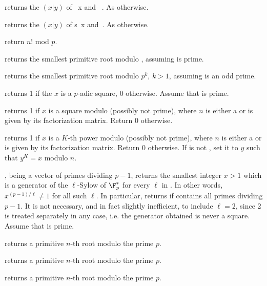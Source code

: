  returns the  $(x|y)$
of ~x and ~. As  otherwise.

 returns the  $(x|y)$
of s~x and~. As  otherwise.

 return $n!$ mod $p$.

 returns the smallest primitive root modulo
, assuming  is prime.

 returns the smallest primitive root modulo $p^k$,
$k > 1$, assuming  is an odd prime.

 returns 1 if the  $x$ is
a $p$-adic square, $0$ otherwise. Assume that  is prime.

 returns 1 if  $x$ is
a square modulo  (possibly not prime), where $n$ is either a 
or is given by its factorization matrix. Return $0$ otherwise.

 returns 1 if 
$x$ is a $K$-th power modulo  (possibly not prime), where $n$ is
either a  or is given by its factorization matrix. Return $0$
otherwise. If  is not , set it to $y$ such that $y^K = x$
modulo $n$.

,  being a vector of
primes dividing $p - 1$, returns the smallest integer $x > 1$ which is a
generator of the $\ell$-Sylow of $\F_p^*$ for every $\ell$ in . In
other words, $x^{(p-1)/\ell} \neq 1$ for all such $\ell$. In particular,
returns  if  contains all primes dividing $p - 1$.
It is not necessary, and in fact slightly inefficient, to include $\ell=2$,
since 2 is treated separately in any case, i.e. the generator obtained is
never a square. Assume that  is prime.

 returns a primitive $n$-th root modulo
the prime $p$.

 returns a primitive $n$-th root modulo
the prime $p$.

 returns a primitive $n$-th root
modulo the prime $p$.


